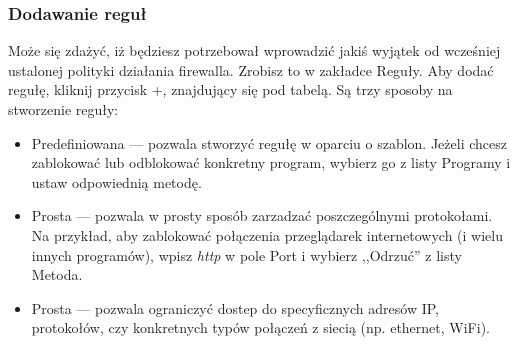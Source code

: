 \subsubsection{Dodawanie reguł}
Może się zdażyć, iż będziesz potrzebował wprowadzić jakiś wyjątek od wcześniej ustalonej polityki działania firewalla. Zrobisz to w zakładce \textcolor{ubuntu_orange}{Reguły}. Aby dodać regułę, kliknij przycisk +, znajdujący się pod tabelą. Są trzy sposoby na stworzenie reguły:

\begin{itemize}
\item \textcolor{ubuntu_orange}{Predefiniowana} --- pozwala stworzyć regułę w oparciu o szablon. Jeżeli chcesz zablokować lub odblokować konkretny program, wybierz go z listy \textcolor{ubuntu_orange}{Programy} i ustaw odpowiednią metodę.
\item \textcolor{ubuntu_orange}{Prosta} --- pozwala w prosty sposób zarzadzać poszczególnymi protokołami. Na przykład, aby zablokować połączenia przeglądarek internetowych (i wielu innych programów), wpisz \textit{http} w pole \textcolor{ubuntu_orange}{Port} i wybierz ,,Odrzuć'' z listy \textcolor{ubuntu_orange}{Metoda}.
\item \textcolor{ubuntu_orange}{Prosta} --- pozwala ograniczyć dostep do specyficznych adresów IP, protokołów, czy konkretnych typów połączeń z siecią (np. ethernet, WiFi).
\end{itemize}
